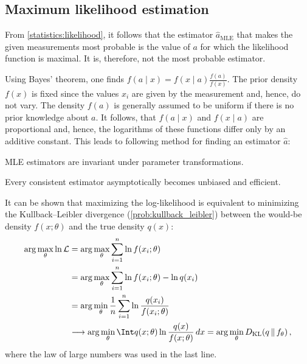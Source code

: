 \subsection{Maximum likelihood estimation}

    From \cref{statistics:likelihood}, it follows that the estimator $\widehat{a}_{\text{MLE}}$ that makes the given measurements most probable is the value of $a$ for which the likelihood function is maximal. It is, therefore, not the most probable estimator.

    Using Bayes' theorem, one finds $f(a\mid x) = f(x\mid a)\frac{f(a)}{f(x)}$. The prior density $f(x)$ is fixed since the values $x_i$ are given by the measurement and, hence, do not vary. The density $f(a)$ is generally assumed to be uniform if there is no prior knowledge about $a$. It follows, that $f(a\mid x)$ and $f(x\mid a)$ are proportional and, hence, the logarithms of these functions differ only by an additive constant. This leads to following method for finding an estimator $\widehat{a}$:
    \begin{property}
        MLE estimators are invariant under parameter transformations.
    \end{property}

    \begin{property}
        Every consistent estimator asymptotically becomes unbiased and efficient.
    \end{property}

    \begin{property}\label{statistics:minimizing_KL}
        It can be shown that maximizing the log-likelihood is equivalent to minimizing the Kullback--Leibler divergence (\cref{prob:kullback_leibler}) between the would-be density $f(x;\theta)$ and the true density $q(x)$:
        \begin{align*}
            \arg\max_\theta\ln\mathcal{L} &= \arg\max_\theta\sum_{i=1}^n\ln f(x_i;\theta)\\
            &= \arg\max_\theta\sum_{i=1}^n\ln f(x_i;\theta) - \ln q(x_i)\\
            &= \arg\min_\theta\frac{1}{n}\sum_{i=1}^n\ln\frac{q(x_i)}{f(x_i;\theta)}\\
            &\longrightarrow\arg\min_\theta\Int q(x;\theta)\ln\frac{q(x)}{f(x;\theta)}\,dx = \arg\min_\theta D_{\text{KL}}(q\,\|\,f_\theta)\,,
        \end{align*}
        where the law of large numbers was used in the last line.
    \end{property}

